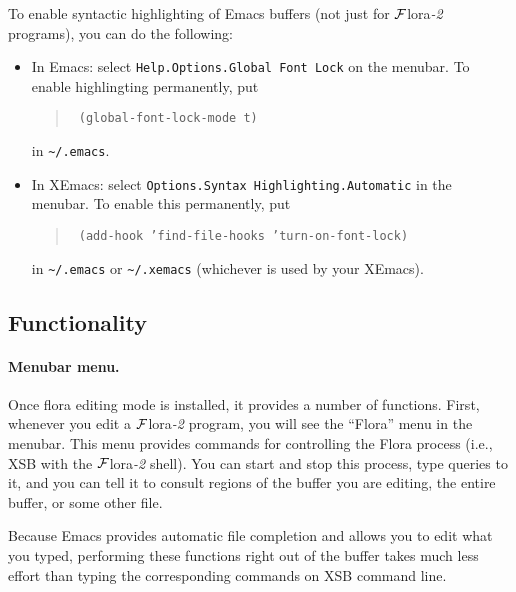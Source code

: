 \documentclass[11pt]{article}
\newcommand{\FLORA}{{\mbox{${\cal F}${\sc lora}\rm\emph{-2}}}\xspace}
\begin{document}
To enable syntactic highlighting of Emacs buffers (not just for \FLORA
programs), you can do the following:
\begin{itemize}
  \item  {\sf In Emacs:} select {\tt Help.Options.Global Font Lock} on
    the menubar.  To enable highlingting permanently, put 
    \begin{quote}
      \tt
      (global-font-lock-mode t)
    \end{quote}
    in \verb|~/.emacs|.
  \item {\sf In XEmacs:} select {\tt Options.Syntax
        Highlighting.Automatic} in the menubar. To enable this permanently, put
      \begin{quote}
        \tt
        (add-hook 'find-file-hooks 'turn-on-font-lock)
      \end{quote}
      in \verb|~/.emacs| or \verb|~/.xemacs| (whichever is used by your
      XEmacs).
\end{itemize}


\subsection{Functionality}


\paragraph{Menubar menu.}
Once flora editing mode is installed, it provides a number of functions.
First, whenever you edit a \FLORA program, you will see the ``Flora'' menu
in the menubar. This menu provides commands for controlling the Flora
process (i.e., XSB with the \FLORA shell). You can start and stop
this process, type queries to it, and you can tell it to consult regions of
the buffer you are editing, the entire buffer, or some other file.

Because Emacs provides automatic file completion and allows you to edit
what you typed, performing these functions right out of the buffer takes
much less effort than typing the corresponding commands on XSB command
line.
\end{document}
